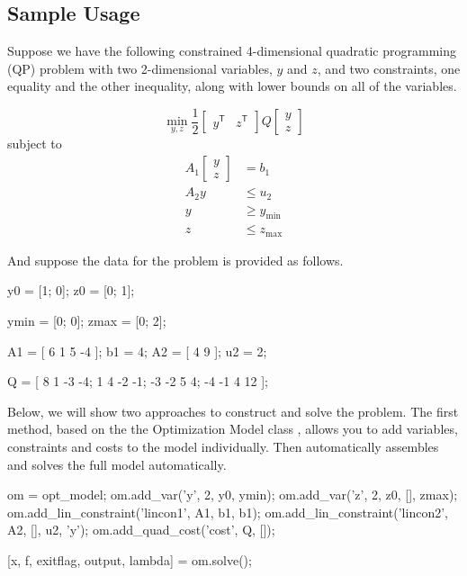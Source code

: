 \documentclass[12pt]{article}
\newcommand{\code}[1]{{\relsize{-0.5}{\tt{{#1}}}}}  %
\newcommand{\trans}[1]{{#1}^{\ensuremath{\mathsf{T}}}}  %
\numberwithin{equation}{section}
\numberwithin{table}{section}
\numberwithin{figure}{section}
\begin{document}
\subsection{Sample Usage}
\label{sec:usage}

Suppose we have the following constrained 4-dimensional quadratic programming (QP) problem with two 2-dimensional variables, $y$ and $z$, and two constraints, one equality and the other inequality, along with lower bounds on all of the variables.

\begin{equation}
\min_{y, z} \frac{1}{2} \left[\begin{array}{cc}\trans{y} & \trans{z} \end{array}\right] Q \left[\begin{array}{c}y \\ z \end{array}\right]
\end{equation}
subject to
\begin{align}
A_1 \left[\begin{array}{c}y \\ z \end{array}\right] &= b_1 \\
A_2 y &\le u_2 \\
y &\ge y_\mathrm{min} \\
z &\le z_\mathrm{max}
\end{align}

And suppose the data for the problem is provided as follows.

\begin{Code}
y0 = [1; 0];
z0 = [0; 1];

ymin = [0; 0];
zmax = [0; 2];

A1 = [ 6 1 5 -4 ];  b1 = 4;
A2 = [ 4 9 ];       u2 = 2;

Q = [ 8  1 -3 -4;
      1  4 -2 -1;
     -3 -2  5  4;
     -4 -1  4  12  ];
\end{Code}

Below, we will show two approaches to construct and solve the problem. The first method, based on the the Optimization Model class \code{opt\_model}, allows you to add variables, constraints and costs to the model individually. Then \code{opt\_model} automatically assembles and solves the full model automatically.

\begin{Code}
om = opt_model;
om.add_var('y', 2, y0, ymin);
om.add_var('z', 2, z0, [], zmax);
om.add_lin_constraint('lincon1', A1, b1, b1);
om.add_lin_constraint('lincon2', A2, [], u2, {'y'});
om.add_quad_cost('cost', Q, []);

[x, f, exitflag, output, lambda] = om.solve();
\end{Code}
\end{document}
